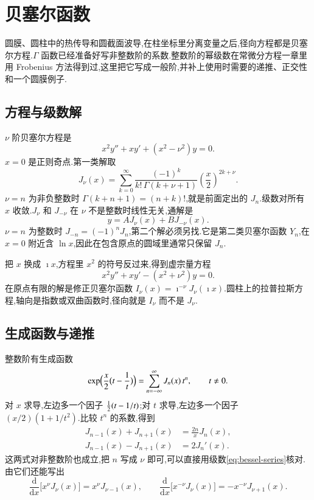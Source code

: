 \section{贝塞尔函数}
圆膜、圆柱中的热传导和圆截面波导,在柱坐标里分离变量之后,径向方程都是贝塞尔方程.$\Gamma$ 函数已经准备好写非整数阶的系数.整数阶的幂级数在常微分方程一章里用 Frobenius 方法得到过,这里把它写成一般阶,并补上使用时需要的递推、正交性和一个圆膜例子.

\subsection{方程与级数解}
$\nu$ 阶贝塞尔方程是
\begin{equation}
  x^2 y''+x y'+(x^2-\nu^2)y=0.
  \label{eq:bessel-ode}
\end{equation}
$x=0$ 是正则奇点.第一类解取
\begin{equation}
  J_\nu(x)
  =\sum_{k=0}^{\infty}
    \frac{(-1)^k}{k!\,\Gamma(k+\nu+1)}
    \left(\frac{x}{2}\right)^{2k+\nu}.
  \label{eq:bessel-series}
\end{equation}
$\nu=n$ 为非负整数时 $\Gamma(k+n+1)=(n+k)!$,就是前面定出的 $J_n$.级数对所有 $x$ 收敛.$J_\nu$ 和 $J_{-\nu}$ 在 $\nu$ 不是整数时线性无关,通解是
\begin{equation}
  y=A J_\nu(x)+B J_{-\nu}(x).
\end{equation}
$\nu=n$ 为整数时 $J_{-n}=(-1)^n J_n$,第二个解必须另找.它是第二类贝塞尔函数 $Y_n$,在 $x=0$ 附近含 $\ln x$,因此在包含原点的圆域里通常只保留 $J_n$.

把 $x$ 换成 $\imath x$,方程里 $x^2$ 的符号反过来,得到虚宗量方程
\begin{equation}
  x^2 y''+x y'-(x^2+\nu^2)y=0.
\end{equation}
在原点有限的解是修正贝塞尔函数 $I_\nu(x)=\imath^{-\nu}J_\nu(\imath x)$.圆柱上的拉普拉斯方程,轴向是指数或双曲函数时,径向就是 $I_\nu$ 而不是 $J_\nu$.

\subsection{生成函数与递推}
整数阶有生成函数
\begin{equation}
  \exp\Bigl(\frac{x}{2}\bigl(t-\frac{1}{t}\bigr)\Bigr)
  =\sum_{n=-\infty}^{\infty} J_n(x)\, t^n,
  \qquad t\neq 0.
  \label{eq:bessel-generating}
\end{equation}
对 $x$ 求导,左边多一个因子 ${\frac{1}{2}}(t-1/t)$;对 $t$ 求导,左边多一个因子 $(x/2)(1+1/t^2)$.比较 $t^n$ 的系数,得到
\begin{align}
  J_{n-1}(x)+J_{n+1}(x)&=\frac{2n}{x}J_n(x),
  \label{eq:bessel-recurrence} \\
  J_{n-1}(x)-J_{n+1}(x)&=2 J_n'(x).
\end{align}
这两式对非整数阶也成立,把 $n$ 写成 $\nu$ 即可,可以直接用级数\eqref{eq:bessel-series}核对.由它们还能写出
\begin{equation}
  \frac{\mathrm{d}}{\mathrm{d}x}\bigl[x^\nu J_\nu(x)\bigr]=x^\nu J_{\nu-1}(x),
  \qquad
  \frac{\mathrm{d}}{\mathrm{d}x}\bigl[x^{-\nu} J_\nu(x)\bigr]=-x^{-\nu} J_{\nu+1}(x).
\end{equation}


